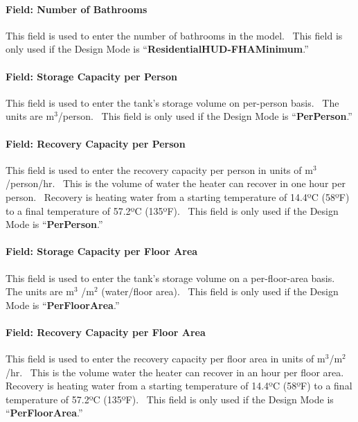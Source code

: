 \paragraph{Field: Number of Bathrooms}\label{field-number-of-bathrooms}

This field is used to enter the number of bathrooms in the model.~ This field is only used if the Design Mode is ``\textbf{ResidentialHUD-FHAMinimum}.''

\paragraph{Field: Storage Capacity per Person}\label{field-storage-capacity-per-person}

This field is used to enter the tank's storage volume on per-person basis.~ The units are m\(^{3}\)/person.~ This field is only used if the Design Mode is ``\textbf{PerPerson}.''

\paragraph{Field: Recovery Capacity per Person}\label{field-recovery-capacity-per-person}

This field is used to enter the recovery capacity per person in units of m\(^{3}\)/person/hr.~ This is the volume of water the heater can recover in one hour per person.~ Recovery is heating water from a starting temperature of 14.4ºC (58ºF) to a final temperature of 57.2ºC (135ºF).~ This field is only used if the Design Mode is ``\textbf{PerPerson}.''

\paragraph{Field: Storage Capacity per Floor Area}\label{field-storage-capacity-per-floor-area}

This field is used to enter the tank's storage volume on a per-floor-area basis.~ The units are m\(^{3}\) /m\(^{2}\) (water/floor area).~ This field is only used if the Design Mode is ``\textbf{PerFloorArea}.''

\paragraph{Field: Recovery Capacity per Floor Area}\label{field-recovery-capacity-per-floor-area}

This field is used to enter the recovery capacity per floor area in units of m\(^{3}\)/m\(^{2}\)/hr.~ This is the volume water the heater can recover in an hour per floor area.~ Recovery is heating water from a starting temperature of 14.4ºC (58ºF) to a final temperature of 57.2ºC (135ºF).~ This field is only used if the Design Mode is ``\textbf{PerFloorArea}.''

